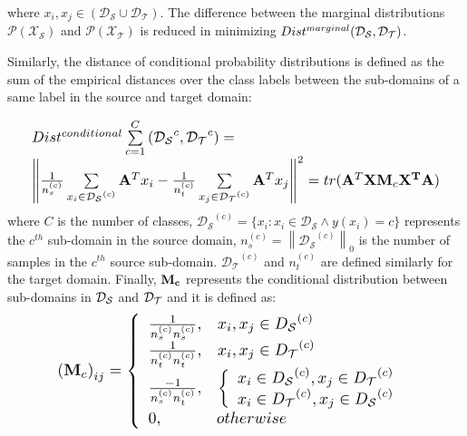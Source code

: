 \documentclass[journal,twocolumn]{IEEEtran}
\begin{document}
\begin{CJK*}{UTF8}{gkai}
where ${x_i},{x_j} \in (\mathcal{D_S} \cup \mathcal{D_T})$. The difference between the marginal distributions $\mathcal{P}(\mathcal{X_S})$ and $\mathcal{P}(\mathcal{X_T})$ is reduced in minimizing {$Dis{t^{marginal}}({{\cal D}_{\cal S}},{{\cal D}_{\cal T}})$}.

Similarly, the distance of conditional probability distributions is defined as the sum of the empirical distances over the class labels between the sub-domains of a same label in the source and target domain: 

\begin{equation}\label{eq:conditional}
		\resizebox{1\hsize}{!}{%
$\begin{array}{c}
		\begin{array}{l}
			Dis{t^{conditional}}\sum\limits_{c = 1}^C {({{\cal D}_{\cal S}}^c,{{\cal D}_{\cal T}}^c)}  = \\
			{\left\| {\frac{1}{{n_s^{(c)}}}\sum\limits_{{x_i} \in {{\cal D}_{\cal S}}^{(c)}} {{{\bf{A}}^T}{x_i}}  - \frac{1}{{n_t^{(c)}}}\sum\limits_{{x_j} \in {{\cal D}_{\cal T}}^{(c)}} {{{\bf{A}}^T}{x_j}} } \right\|^2}= tr({{\bf{A}}^T}{\bf{X}}{{\bf{M}}_c}{{\bf{X}}^{\bf{T}}}{\bf{A}})
		\end{array}
	\end{array}$}
\end{equation}
where $C$ is the number of classes, $\mathcal{D_S}^{(c)} = \{ {x_i}:{x_i} \in \mathcal{D_S} \wedge y({x_i}) = c\} $ represents the ${c^{th}}$ sub-domain in the source domain, $n_s^{(c)} = {\left\| {\mathcal{D_S}^{(c)}} \right\|_0}$ is the number of samples in the ${c^{th}}$ {source} sub-domain. $\mathcal{D_T}^{(c)}$ and $n_t^{(c)}$ are defined similarly for the target domain. Finally, $\bf M_c$ represents the conditional distribution between sub-domains in ${{\cal D}_{\cal S}}$ and ${{\cal D}_{\cal T}}$ and it is defined as: 
\begin{equation}\label{eq:Mc}
		\resizebox{0.85\hsize}{!}{%
	$\begin{array}{*{20}{c}}
		{{{({{\bf{M}}_c})}_{ij}} = \left\{ {\begin{array}{*{20}{l}}
					{\frac{1}{{n_s^{(c)}n_s^{(c)}}},\;\;\;{x_i},{x_j} \in {D_{\cal S}}^{(c)}}\\
					{\frac{1}{{n_t^{(c)}n_t^{(c)}}},\;\;\;{x_i},{x_j} \in {D_{\cal T}}^{(c)}}\\
					{\frac{{ - 1}}{{n_s^{(c)}n_t^{(c)}}},\;\;\;\left\{ {\begin{array}{*{20}{l}}
								{{x_i} \in {D_{\cal S}}^{(c)},{x_j} \in {D_{\cal T}}^{(c)}}\\
								{{x_i} \in {D_{\cal T}}^{(c)},{x_j} \in {D_{\cal S}}^{(c)}}
							\end{array}} \right.}\\
						{0,\;\;\;\;\;\;\;\;\;\;\;\;otherwise}
					\end{array}} \right.}
			\end{array}$}
		\end{equation}
		

\end{CJK*}
\end{document}
